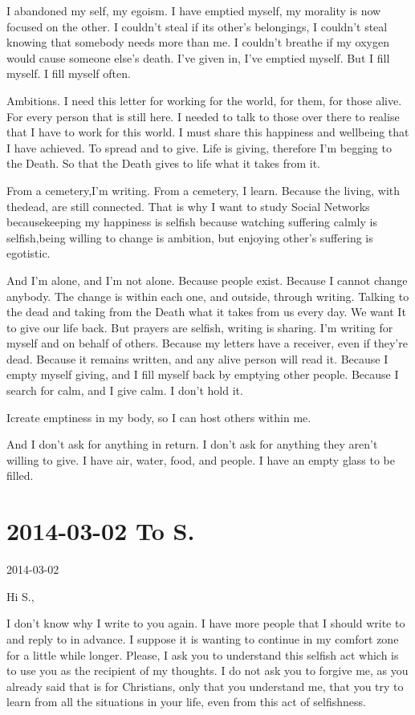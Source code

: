 \documentclass[]{book}
\begin{document}
I abandoned my self, my egoism. I have emptied myself, my morality is now focused on the other. I couldn't steal if its other's belongings, I couldn't steal knowing that somebody needs more than me. I couldn't breathe if my oxygen would cause someone else's death. I've given in, I've emptied myself. But I fill myself. I fill myself often.

Ambitions. I need this letter for working for the world, for them, for those alive. For every person that is still here. I needed to talk to those over there to realise that I have to work for this world. I must share this happiness and wellbeing that I have achieved. To spread and to give. Life is giving, therefore I'm begging to the Death. So that the Death gives to life what it takes from it.

From a cemetery,I'm writing. From a cemetery, I learn. Because the living, with thedead, are still connected. That is why I want to study Social Networks becausekeeping my happiness is selfish because watching suffering calmly is selfish,being willing to change is ambition, but enjoying other's suffering is egotistic.

And I'm alone, and I'm not alone. Because people exist. Because I cannot change anybody. The change is within each one, and outside, through writing. Talking to the dead and taking from the Death what it takes from us every day. We want It to give our life back. But prayers are selfish, writing is sharing. I'm writing for myself and on behalf of others. Because my letters have a receiver, even if they're dead. Because it remains written, and any alive person will read it. Because I empty myself giving, and I fill myself back by emptying other people. Because I search for calm, and I give calm. I don't hold it.

Icreate emptiness in my body, so I can host others within me.

And I don't ask for anything in return. I don't ask for anything they aren't willing to give. I have air, water, food, and people. I have an empty glass to be filled.

\hypertarget{toS20140302}{%
\section*{2014-03-02 To S.}\label{toS20140302}}

2014-03-02

Hi S.,

I don't know why I write to you again. I have more people that I should write to and reply to in advance. I suppose it is wanting to continue in my comfort zone for a little while longer. Please, I ask you to understand this selfish act which is to use you as the recipient of my thoughts. I do not ask you to forgive me, as you already said that is for Christians, only that you understand me, that you try to learn from all the situations in your life, even from this act of selfishness.
\end{document}
